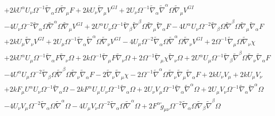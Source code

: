 \documentclass[10pt,letterpaper]{article}
\numberwithin{equation}{section}
\begin{document}
\begin{eqnarray}
&& + 2 k U^{\alpha } U_{\nu } \Omega^{-1} \tilde{\nabla}_{\alpha }\Omega \tilde{\nabla}_{\mu }F + 2 k U_{\nu } \tilde{\nabla}_{\mu }V^{GI}{} + 2 U_{\nu } \Omega^{-1} \tilde{\nabla}_{\alpha }\tilde{\nabla}^{\alpha }\Omega \tilde{\nabla}_{\mu }V^{GI}{} \nonumber \\ 
&& - 4 U_{\nu } \Omega^{-2} \tilde{\nabla}_{\alpha }\Omega \tilde{\nabla}^{\alpha }\Omega \tilde{\nabla}_{\mu }V^{GI}{} + 2 U^{\alpha } U_{\nu } \Omega^{-1} \tilde{\nabla}_{\beta }\tilde{\nabla}^{\beta }\Omega \tilde{\nabla}_{\mu }\tilde{\nabla}_{\alpha }F - 4 U^{\alpha } U_{\nu } \Omega^{-2} \tilde{\nabla}_{\beta }\Omega \tilde{\nabla}^{\beta }\Omega \tilde{\nabla}_{\mu }\tilde{\nabla}_{\alpha }F \nonumber \\ 
&& + 2 k U_{\mu } \tilde{\nabla}_{\nu }V^{GI}{} + 2 U_{\mu } \Omega^{-1} \tilde{\nabla}_{\alpha }\tilde{\nabla}^{\alpha }\Omega \tilde{\nabla}_{\nu }V^{GI}{} - 4 U_{\mu } \Omega^{-2} \tilde{\nabla}_{\alpha }\Omega \tilde{\nabla}^{\alpha }\Omega \tilde{\nabla}_{\nu }V^{GI}{} + 2 \Omega^{-1} \tilde{\nabla}_{\mu }\Omega \tilde{\nabla}_{\nu }\chi \nonumber \\ 
&& + 2 k U^{\alpha } U_{\mu } \Omega^{-1} \tilde{\nabla}_{\alpha }F \tilde{\nabla}_{\nu }\Omega + 2 k \Omega^{-1} \tilde{\nabla}_{\mu }F \tilde{\nabla}_{\nu }\Omega + 2 \Omega^{-1} \tilde{\nabla}_{\mu }\chi \tilde{\nabla}_{\nu }\Omega + 2 U^{\alpha } U_{\mu } \Omega^{-1} \tilde{\nabla}_{\beta }\tilde{\nabla}^{\beta }\Omega \tilde{\nabla}_{\nu }\tilde{\nabla}_{\alpha }F \nonumber \\ 
&& - 4 U^{\alpha } U_{\mu } \Omega^{-2} \tilde{\nabla}_{\beta }\Omega \tilde{\nabla}^{\beta }\Omega \tilde{\nabla}_{\nu }\tilde{\nabla}_{\alpha }F - 2 \tilde{\nabla}_{\nu }\tilde{\nabla}_{\mu }\chi - 2 \Omega^{-1} \tilde{\nabla}^{\alpha }\Omega \tilde{\nabla}_{\nu }\tilde{\nabla}_{\mu }\tilde{\nabla}_{\alpha }F+2 k U_{\nu } V_{\mu } + 2 k U_{\mu } V_{\nu } \nonumber \\ 
&& + 2 k F_{\mu } U^{\alpha } U_{\nu } \Omega^{-1} \tilde{\nabla}_{\alpha }\Omega - 2 k F^{\alpha } U_{\mu } U_{\nu } \Omega^{-1} \tilde{\nabla}_{\alpha }\Omega + 2 U_{\nu } V_{\mu } \Omega^{-1} \tilde{\nabla}_{\alpha }\tilde{\nabla}^{\alpha }\Omega + 2 U_{\mu } V_{\nu } \Omega^{-1} \tilde{\nabla}_{\alpha }\tilde{\nabla}^{\alpha }\Omega \nonumber \\ 
&& - 4 U_{\nu } V_{\mu } \Omega^{-2} \tilde{\nabla}_{\alpha }\Omega \tilde{\nabla}^{\alpha }\Omega - 4 U_{\mu } V_{\nu } \Omega^{-2} \tilde{\nabla}_{\alpha }\Omega \tilde{\nabla}^{\alpha }\Omega + 2 F^{\alpha } \tilde{g}_{\mu \nu } \Omega^{-2} \tilde{\nabla}_{\alpha }\Omega \tilde{\nabla}_{\beta }\tilde{\nabla}^{\beta }\Omega \nonumber \\ 

\end{eqnarray}
\end{document}
